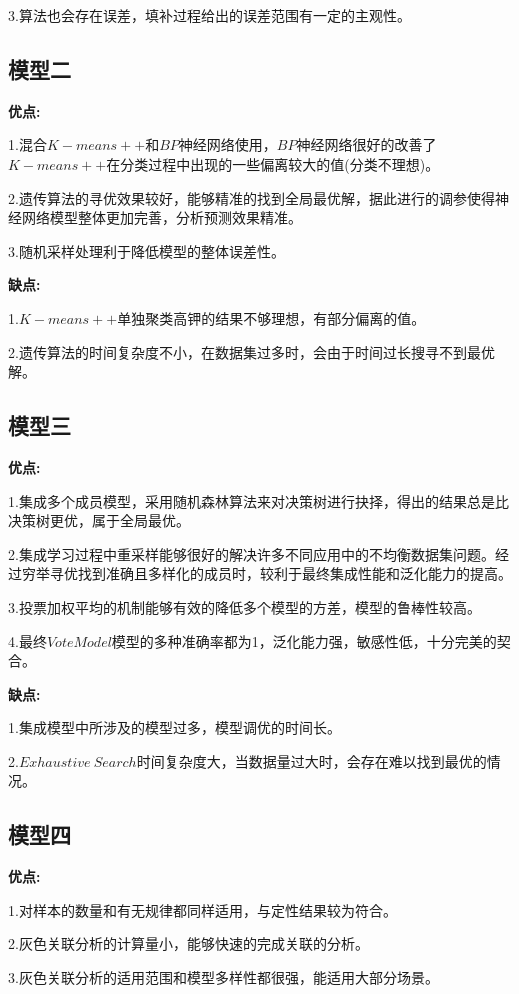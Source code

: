 \documentclass[UTF8]{ctexart}
\begin{document}
3.算法也会存在误差，填补过程给出的误差范围有一定的主观性。

\subsection{模型二}

\noindent \textbf{优点:}

1.混合$K-means++$和$BP$神经网络使用，$BP$神经网络很好的改善了$K-means++$在分类过程中出现的一些偏离较大的值(分类不理想)。

2.遗传算法的寻优效果较好，能够精准的找到全局最优解，据此进行的调参使得神经网络模型整体更加完善，分析预测效果精准。

3.随机采样处理利于降低模型的整体误差性。


\noindent \textbf{缺点:}

1.$K-means++$单独聚类高钾的结果不够理想，有部分偏离的值。

2.遗传算法的时间复杂度不小，在数据集过多时，会由于时间过长搜寻不到最优解。


\subsection{模型三}
\textbf{优点:}

1.集成多个成员模型，采用随机森林算法来对决策树进行抉择，得出的结果总是比决策树更优，属于全局最优。

2.集成学习过程中重采样能够很好的解决许多不同应用中的不均衡数据集问题。经过穷举寻优找到准确且多样化的成员时，较利于最终集成性能和泛化能力的提高。

3.投票加权平均的机制能够有效的降低多个模型的方差，模型的鲁棒性较高。

4.最终$VoteModel$模型的多种准确率都为1，泛化能力强，敏感性低，十分完美的契合。

\textbf{缺点:}

1.集成模型中所涉及的模型过多，模型调优的时间长。

2.$Exhaustive\ Search$时间复杂度大，当数据量过大时，会存在难以找到最优的情况。

\subsection{模型四}
\textbf{优点:}

1.对样本的数量和有无规律都同样适用，与定性结果较为符合。

2.灰色关联分析的计算量小，能够快速的完成关联的分析。

3.灰色关联分析的适用范围和模型多样性都很强，能适用大部分场景。
\end{document}

